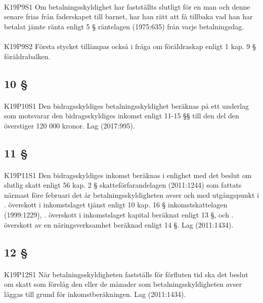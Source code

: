 \documentclass[a4paper,notitlepage,openany,10pt]{book}
\begin{document}
\paragraph*{}
{\tiny K19P9S1}
Om betalningsskyldighet har fastställts slutligt för en man och denne senare frias från faderskapet till barnet, har han rätt att få tillbaka vad han har betalat jämte ränta enligt 5 § räntelagen (1975:635) från varje betalningsdag.
\paragraph*{}
{\tiny K19P9S2}
Första stycket tillämpas också i fråga om föräldraskap enligt 1 kap. 9 § föräldrabalken.
\subsection*{10 §}
\paragraph*{}
{\tiny K19P10S1}
Den bidragsskyldiges betalningsskyldighet beräknas på ett underlag som motsvarar den bidragsskyldiges inkomst enligt 11-15 §§ till den del den överstiger 120 000 kronor.
Lag (2017:995).
\subsection*{11 §}
\paragraph*{}
{\tiny K19P11S1}
Den bidragsskyldiges inkomst beräknas i enlighet med det beslut om slutlig skatt enligt 56 kap. 2 § skatteförfarandelagen (2011:1244) som fattats närmast före februari det år betalningsskyldigheten avser och med utgångspunkt i
. överskott i inkomstslaget tjänst enligt 10 kap. 16 § inkomstskattelagen (1999:1229),
. överskott i inkomstslaget kapital beräknat enligt 13 §, och
. överskott av en näringsverksamhet beräknad enligt 14 §.
Lag (2011:1434).
\subsection*{12 §}
\paragraph*{}
{\tiny K19P12S1}
När betalningsskyldigheten fastställs för förfluten tid ska det beslut om skatt som förelåg den eller de månader som betalningsskyldigheten avser läggas till grund för inkomstberäkningen.
Lag (2011:1434).
\end{document}
